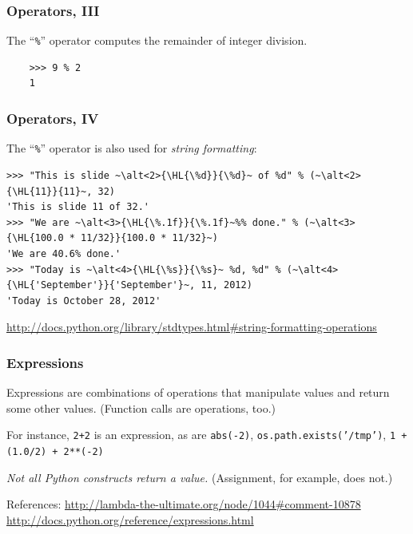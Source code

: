 \documentclass[english,serif,mathserif,xcolor=pdftex,dvipsnames,table]{beamer}
\begin{document}
\begin{frame}[fragile]
  \frametitle{Operators, III}
  The ``\texttt{\%}'' operator computes the remainder of integer division.
  \begin{lstlisting}
    >>> 9 % 2
    1
  \end{lstlisting}
\end{frame}


\begin{frame}[fragile]
  \frametitle{Operators, IV}
  The ``\texttt{\%}'' operator is also used for \emph{string
    formatting}:
\begin{lstlisting}[showstringspaces=false]
>>> "This is slide ~\alt<2>{\HL{\%d}}{\%d}~ of %d" % (~\alt<2>{\HL{11}}{11}~, 32)
'This is slide 11 of 32.'
>>> "We are ~\alt<3>{\HL{\%.1f}}{\%.1f}~%% done." % (~\alt<3>{\HL{100.0 * 11/32}}{100.0 * 11/32}~)
'We are 40.6% done.'
>>> "Today is ~\alt<4>{\HL{\%s}}{\%s}~ %d, %d" % (~\alt<4>{\HL{'September'}}{'September'}~, 11, 2012)
'Today is October 28, 2012'
\end{lstlisting}


  \begin{references}
    \url{http://docs.python.org/library/stdtypes.html#string-formatting-operations}
  \end{references}
\end{frame}


\begin{frame}[fragile]
  \frametitle{Expressions}

  Expressions are combinations of operations that manipulate values
  and return some other values.  (Function calls are operations, too.)

  \+
  For instance, \texttt{2+2} is an expression, as are
  \texttt{abs(-2)}, \texttt{os.path.exists('/tmp')},
  \texttt{1 + (1.0/2) + 2**(-2)}

  \+
  \emph{Not all Python constructs return a value.}
  (Assignment, for example, does not.)

  \+\scriptsize
  References:
  \url{http://lambda-the-ultimate.org/node/1044#comment-10878}
  \url{http://docs.python.org/reference/expressions.html}

\end{frame}
\end{document}
